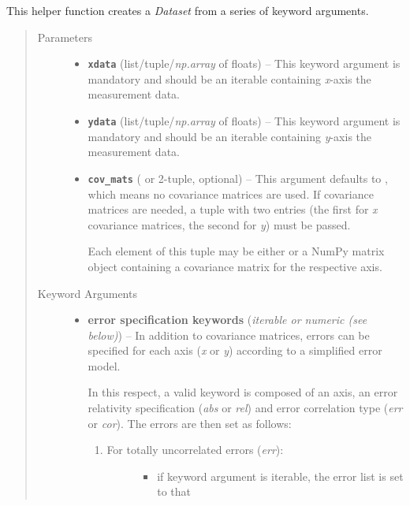 \documentclass[a4paper,10pt,english]{sphinxmanual}
\begin{document}
\begin{fulllineitems}
\label{module_doc:kafe.dataset_tools.build_dataset}
This helper function creates a \emph{Dataset} from a series of keyword
arguments.
\begin{quote}\begin{description}
\item[{Parameters}] \leavevmode\begin{itemize}
\item {} 
\textbf{\texttt{xdata}} (list/tuple/\emph{np.array} of floats) -- This keyword argument is mandatory and should be an iterable
containing \emph{x}-axis the measurement data.

\item {} 
\textbf{\texttt{ydata}} (list/tuple/\emph{np.array} of floats) -- This keyword argument is mandatory and should be an iterable
containing \emph{y}-axis the measurement data.

\item {} 
\textbf{\texttt{cov\_mats}} ( or 2-tuple, optional) -- 
This argument defaults to , which means no covariance matrices
are used. If covariance matrices are needed, a tuple with two entries
(the first for \emph{x} covariance matrices, the second for \emph{y}) must be
passed.

Each element of this tuple may be either  or a NumPy matrix
object containing a covariance matrix for the respective axis.


\end{itemize}

\item[{Keyword Arguments}] \leavevmode\begin{itemize}
\item {} 
\textbf{error specification keywords} (\emph{iterable or numeric (see below)}) --
In addition to covariance matrices, errors can be specified for each
axis (\emph{x} or \emph{y}) according to a simplified error model.

In this respect, a valid keyword is composed of an axis, an error
relativity specification (\emph{abs} or \emph{rel}) and error correlation type
(\emph{err} or \emph{cor}). The errors are then set as follows:
\begin{enumerate}
\item {} \begin{description}
\item[{For totally uncorrelated errors (\emph{err}):}] \leavevmode\begin{itemize}
\item {} 
if keyword argument is iterable, the error list is set to that


\end{itemize}
\end{description}
\end{enumerate}
\end{itemize}
\end{description}
\end{quote}
\end{fulllineitems}
\end{document}
